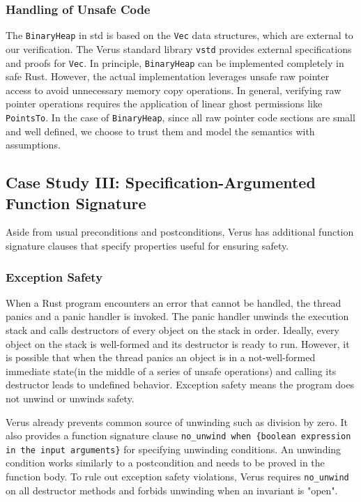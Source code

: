 \documentclass[conference]{IEEEtran}
\begin{document}
\subsubsection{Handling of Unsafe Code}
The \texttt{BinaryHeap} in std is based on the \texttt{Vec} data structures, which are external to our verification. The Verus standard library \texttt{vstd} provides external specifications and proofs for \texttt{Vec}. In principle, \texttt{BinaryHeap} can be implemented completely in safe Rust. However, the actual implementation leverages unsafe raw pointer access to avoid unnecessary memory copy operations. In general, verifying raw pointer operations requires the application of linear ghost permissions like \texttt{PointsTo}. In the case of \texttt{BinaryHeap}, since all raw pointer code sections are small and well defined, we choose to trust them and model the semantics with assumptions. 

\subsection{Case Study III: Specification-Argumented Function Signature}
Aside from usual preconditions and postconditions, Verus has additional function signature clauses that specify properties useful for ensuring safety. 
\subsubsection{Exception Safety}
When a Rust program encounters an error that cannot be handled, the thread panics and a panic handler is invoked. The panic handler unwinds the execution stack and calls destructors of every object on the stack in order. Ideally, every object on the stack is well-formed and its destructor is ready to run. However, it is possible that when the thread panics an object is in a not-well-formed immediate state(in the middle of a series of unsafe operations) and calling its destructor leads to undefined behavior. Exception safety means the program does not unwind or unwinds safety.     

Verus already prevents common source of unwinding such as division by zero. It also provides a function signature clause \texttt{no\_unwind when \{boolean expression in the input arguments\}} for specifying unwinding conditions. An unwinding condition works similarly to a postcondition and needs to be proved in the function body. To rule out exception safety violations, Verus requires \texttt{no\_unwind} on all destructor methods and forbids unwinding when an invariant is "open".  
\end{document}
